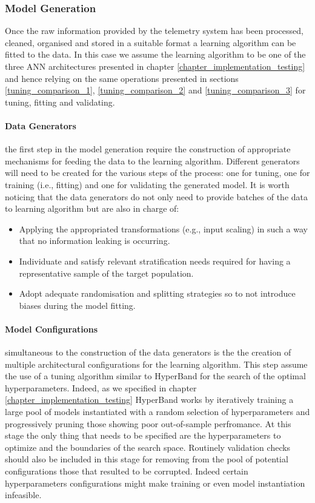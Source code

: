 \subsubsection{Model Generation}
\label{model_generation}
Once the raw information provided by the telemetry system has been processed, cleaned, organised and stored in a suitable format a learning algorithm can be fitted to the data. In this case we assume the learning algorithm to be one of the three ANN architectures presented in chapter \ref{chapter_implementation_testing} and hence relying on the same operations presented in sections \ref{tuning_comparison_1}, \ref{tuning_comparison_2} and \ref{tuning_comparison_3} for tuning, fitting and validating.

\paragraph*{Data Generators} the first step in the model generation require the construction of appropriate mechanisms for feeding the data to the learning algorithm. Different generators will need to be created for the various steps of the process: one for tuning, one for training (i.e., fitting) and one for validating the generated model. It is worth noticing that the data generators do not only need to provide batches of the data to learning algorithm but are also in charge of: 

\begin{itemize}
    \item Applying the appropriated transformations (e.g., input scaling) in such a way that no information leaking is occurring.
    \item Individuate and satisfy relevant stratification needs required for having a representative sample of the target population.
    \item Adopt adequate randomisation and splitting strategies so to not introduce biases during the model fitting.
\end{itemize}

\paragraph*{Model Configurations} simultaneous to the construction of the data generators is the the creation of multiple architectural configurations for the learning algorithm. This step assume the use of a tuning algorithm similar to HyperBand \cite{li2017hyperband} for the search of the optimal hyperparameters. Indeed, as we specified in chapter \ref{chapter_implementation_testing} HyperBand works by iteratively training a large pool of models instantiated with a random selection of hyperparameters and progressively pruning those showing poor out-of-sample perfromance. At this stage the only thing that needs to be specified are the hyperparameters to optimize and the boundaries of the search space. Routinely validation checks should also be included in this stage for removing from the pool of potential configurations those that resulted to be corrupted. Indeed certain hyperparameters configurations might make training or even model instantiation infeasible.


